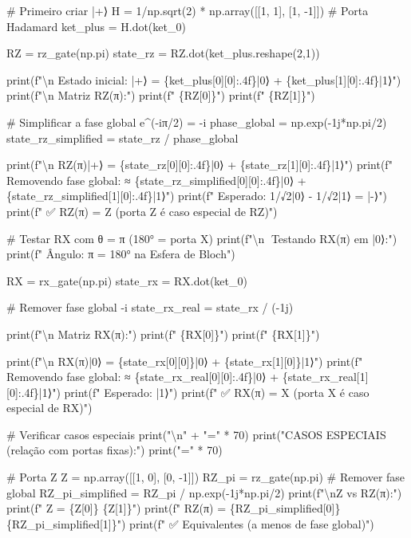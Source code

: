 \documentclass[
  brazilian,
]{report}
\newenvironment{Shaded}{\begin{snugshade}}{\end{snugshade}}
\newcommand{\NormalTok}[1]{\textcolor[rgb]{0.00,0.23,0.31}{#1}}
\begin{document}
\begin{Shaded}
\begin{Highlighting}[]
\NormalTok{\# Primeiro criar |+⟩}
\NormalTok{H = 1/np.sqrt(2) * np.array([[1, 1], [1, {-}1]])  \# Porta Hadamard}
\NormalTok{ket\_plus = H.dot(ket\_0)}

\NormalTok{RZ = rz\_gate(np.pi)}
\NormalTok{state\_rz = RZ.dot(ket\_plus.reshape(2,1))}

\NormalTok{print(f"\textbackslash{}n   Estado inicial: |+⟩ = \{ket\_plus[0][0]:.4f\}|0⟩ + \{ket\_plus[1][0]:.4f\}|1⟩")}
\NormalTok{print(f"\textbackslash{}n   Matriz RZ(π):")}
\NormalTok{print(f"   \{RZ[0]\}")}
\NormalTok{print(f"   \{RZ[1]\}")}

\NormalTok{\# Simplificar a fase global e\^{}({-}iπ/2) = {-}i}
\NormalTok{phase\_global = np.exp({-}1j*np.pi/2)}
\NormalTok{state\_rz\_simplified = state\_rz / phase\_global}

\NormalTok{print(f"\textbackslash{}n   RZ(π)|+⟩ = \{state\_rz[0][0]:.4f\}|0⟩ + \{state\_rz[1][0]:.4f\}|1⟩")}
\NormalTok{print(f"   Removendo fase global: ≈ \{state\_rz\_simplified[0][0]:.4f\}|0⟩ + \{state\_rz\_simplified[1][0]:.4f\}|1⟩")}
\NormalTok{print(f"   Esperado: 1/√2|0⟩ {-} 1/√2|1⟩ = |{-}⟩")}
\NormalTok{print(f"   ✅ RZ(π) = Z (porta Z é caso especial de RZ)")}

\NormalTok{\# Testar RX com θ = π (180° = porta X)}
\NormalTok{print(f"\textbackslash{}n🔹 Testando RX(π) em |0⟩:")}
\NormalTok{print(f"   Ângulo: π = 180° na Esfera de Bloch")}

\NormalTok{RX = rx\_gate(np.pi)}
\NormalTok{state\_rx = RX.dot(ket\_0)}

\NormalTok{\# Remover fase global {-}i}
\NormalTok{state\_rx\_real = state\_rx / ({-}1j)}

\NormalTok{print(f"\textbackslash{}n   Matriz RX(π):")}
\NormalTok{print(f"   \{RX[0]\}")}
\NormalTok{print(f"   \{RX[1]\}")}

\NormalTok{print(f"\textbackslash{}n   RX(π)|0⟩ = \{state\_rx[0][0]\}|0⟩ + \{state\_rx[1][0]\}|1⟩")}
\NormalTok{print(f"   Removendo fase global: ≈ \{state\_rx\_real[0][0]:.4f\}|0⟩ + \{state\_rx\_real[1][0]:.4f\}|1⟩")}
\NormalTok{print(f"   Esperado: |1⟩")}
\NormalTok{print(f"   ✅ RX(π) = X (porta X é caso especial de RX)")}

\NormalTok{\# Verificar casos especiais}
\NormalTok{print("\textbackslash{}n" + "=" * 70)}
\NormalTok{print("CASOS ESPECIAIS (relação com portas fixas):")}
\NormalTok{print("=" * 70)}

\NormalTok{\# Porta Z}
\NormalTok{Z = np.array([[1, 0], [0, {-}1]])}
\NormalTok{RZ\_pi = rz\_gate(np.pi)}
\NormalTok{\# Remover fase global}
\NormalTok{RZ\_pi\_simplified = RZ\_pi / np.exp({-}1j*np.pi/2)}
\NormalTok{print(f"\textbackslash{}nZ vs RZ(π):")}
\NormalTok{print(f"  Z =     \{Z[0]\}  \{Z[1]\}")}
\NormalTok{print(f"  RZ(π) = \{RZ\_pi\_simplified[0]\}  \{RZ\_pi\_simplified[1]\}")}
\NormalTok{print(f"  ✅ Equivalentes (a menos de fase global)")}


\end{Highlighting}
\end{Shaded}
\end{document}
